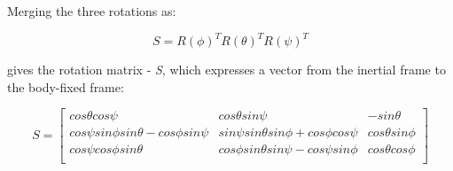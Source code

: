 Merging the three rotations as: 

 \begin{equation}
\label{S1}	
 	S=R(\phi)^{T}R(\theta)^{T}R(\psi)^{T}
 \end{equation}
 
gives the rotation matrix - \textit{S}, which expresses a vector from the inertial frame to the body-fixed frame: 
 
  \begin{equation}
\label{S2}
 S=\begin{bmatrix}
 	cos\theta cos\psi & cos\theta sin\psi & -sin\theta \\
 	cos\psi sin\phi sin\theta-cos\phi sin\psi & sin\psi sin\theta sin\phi+cos\phi cos\psi & cos\theta sin\phi \\
 	cos\psi cos\phi sin\theta & cos\phi sin\theta sin\psi-cos\psi sin\phi & cos\theta cos\phi \\
 	\end{bmatrix}
 	 \end{equation}
 	 
 	 
 	 
 	 
 	 
 	 